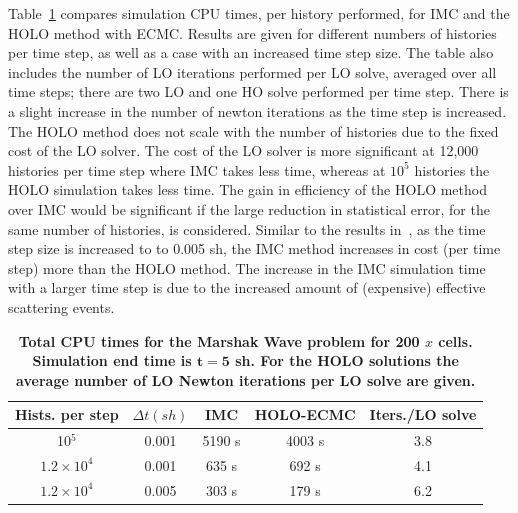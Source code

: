 \documentclass{mc2013}
\begin{document}
Table~\ref{marshak_table} compares simulation CPU times, per history performed, for IMC and the HOLO method
with ECMC.  Results are given for different numbers of histories per time step, as
well as a case with an increased time step size.  The table also includes the number of LO
iterations performed per LO solve, averaged over all time steps; there are two LO and
one HO solve performed per time step.  There is a slight increase in the number of
newton iterations as the time step is increased.  The HOLO method does not scale with the number of
histories due to the fixed cost of the LO solver.  The cost of the LO solver is more
significant at 12,000 histories per time step where IMC takes less time, whereas at
$10^5$ histories the HOLO simulation takes less time.    The gain in efficiency of
the HOLO method over IMC would be significant if the large reduction in statistical
error, for the same number of histories, is considered.  Similar to the results
in~\cite{park}, as the time step size is increased to to 0.005 sh, the IMC method
increases in cost (per time step) more than the HOLO method. The increase in the IMC
simulation time with a larger time step is due to the increased amount of (expensive) effective scattering
events.   
\begin{table}[H]
\centering
\caption{\label{marshak_table} \textbf{Total CPU times for the Marshak Wave problem
    for 200 $x$ cells.  Simulation end time is $\mathbf{t=5}$ sh. For the HOLO
    solutions the average number of LO Newton iterations per LO solve are given. }}
\vspace{-0.1in}
	\begin{tabular}{|cc|c|cc|}\hline
Hists. per step & $\Delta t (sh)$ & IMC & HOLO-ECMC & Iters./LO solve \\ \hline
10$^5$                    &   0.001	& 5190 s &	4003 s & 3.8               \\
$1.2\times10^4 $   &    0.001	& 635   s &	   692 s   & 4.1               \\
$1.2\times10^4$     &   0.005	& 303   s &    179 s   & 6.2                \\ \hline
\end{tabular}
\end{table}
\end{document}
